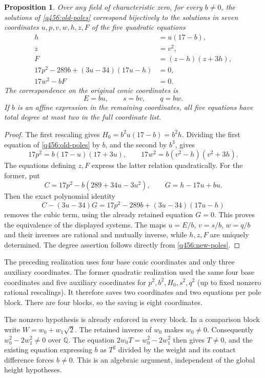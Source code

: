 \documentclass[11pt,a4paper]{article}
\newtheorem{proposition}[theorem]{Proposition}
\theoremstyle{definition}
\theoremstyle{remark}
\begin{document}
\begin{proposition}\label{q456:pole-model}
Over any field of characteristic zero, for every $b\ne0$, the
solutions of \eqref{q456:old-poles} correspond bijectively to the
solutions in seven coordinates $u,p,v,w,h,z,F$ of the five quadratic
equations
\begin{equation}\label{q456:new-poles}
 \begin{split}
 h&=u(17-b),\\
 z&=v^2,\\
 F&=(z-h)(z+3h),\\
 17p^2-289b+(3u-34)(17u-h)&=0,\\
 17w^2-bF&=0.
 \end{split}
\end{equation}
The correspondence on the original conic coordinates is
\[
                        E=bu,\qquad s=bv,\qquad q=bw.
\]
If $b$ is an affine expression in the remaining coordinates,
all five equations have total degree at most two in the full
coordinate list.
\end{proposition}
\begin{proof}
The first rescaling gives $H_0=b^2u(17-b)=b^2h$. Dividing the
first equation of \eqref{q456:old-poles} by $b$, and the second
by $b^3$, gives
\[
 17p^2=b(17-u)(17+3u),\qquad
 17w^2=b(v^2-h)(v^2+3h).
\]
The equations defining $z,F$ express the latter relation quadratically.
For the former, put
\[
 C=17p^2-b(289+34u-3u^2),\qquad
 G=h-17u+bu.
\]
Then the exact polynomial identity
\[
 C-(3u-34)G
       =17p^2-289b+(3u-34)(17u-h)
\]
removes the cubic term, using the already retained equation $G=0$.
This proves the equivalence of the displayed systems. The maps
$u=E/b$, $v=s/b$, $w=q/b$ and their inverses are rational and
mutually inverse, while $h,z,F$ are uniquely determined. The
degree assertion follows directly from \eqref{q456:new-poles}.
\end{proof}

The preceding realization uses four base conic coordinates and only
three auxiliary coordinates. The former quadratic realization used
the same four base coordinates and five auxiliary coordinates for
$p^2,b^2,H_0,s^2,q^2$ (up to fixed nonzero rational rescalings).
It therefore saves two coordinates and two equations per pole block.
There are four blocks, so the saving is eight coordinates.

The nonzero hypothesis is already enforced in every block. In a
comparison block write $W=w_0+w_1\sqrt2$. The retained inverse of
$w_0$ makes $w_0\ne0$. Consequently
$w_0^2-2w_1^2\ne0$ over $\mathbb Q$. The equation
$2w_0T=w_0^2-2w_1^2$ then gives $T\ne0$, and the existing
equation expressing $b$ as $T^2$ divided by the weight and its
contact difference forces $b\ne0$. This is an algebraic argument,
independent of the global height hypotheses.
\end{document}
